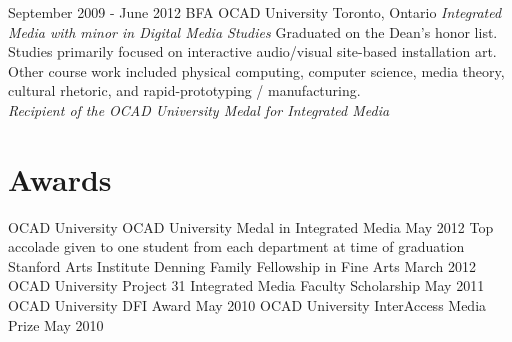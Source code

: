 \documentclass[10pt,a4paper,sans]{moderncv}   %
\begin{document}
\cventry
  {September 2009 - June 2012}
  {BFA}
  {OCAD University}
  {Toronto, Ontario}
  {\textit{Integrated Media with minor in Digital Media Studies}}
  {Graduated on the Dean's honor list. Studies primarily focused on interactive audio/visual site-based installation art.  Other course work included physical computing, computer science, media theory, cultural rhetoric, and rapid-prototyping / manufacturing. \\\textit{Recipient of the OCAD University Medal for Integrated Media }}

 \section{Awards}
 \cventry
   {}{OCAD University}
   {OCAD University Medal in Integrated Media}
   {May 2012}{}
   {Top accolade given to one student from each department at time of graduation}
 \cventry
   {}{Stanford Arts Institute}
   {Denning Family Fellowship in Fine Arts}
   {March 2012}{}{}
 \cventry
   {}{OCAD University}
   {Project 31 Integrated Media Faculty Scholarship}
   {May 2011}{}{}
 \cventry
   {}{OCAD University}
   {DFI Award}
   {May 2010}{}{}
 \cventry
   {}{OCAD University}
   {InterAccess Media Prize}
   {May 2010}{}{}
\end{document}
